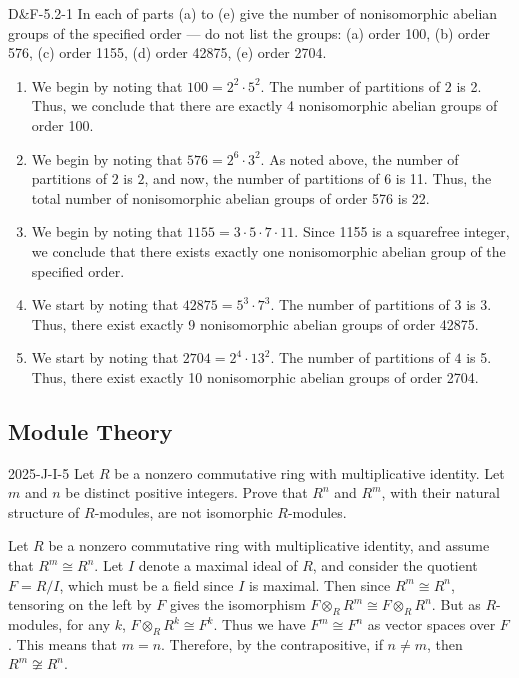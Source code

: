 \documentclass{article}
\begin{document}
	\begin{prb}{D\&F-5.2-1}
		In each of parts (a) to (e) give the number of nonisomorphic abelian groups of the specified order --- do not list the groups: (a) order 100, (b) order 576, (c) order 1155, (d) order 42875, (e) order 2704. 
	\end{prb}
	\begin{enumerate}[itemsep =-2pt,label = (\alph{*})]
		\item We begin by noting that $100 = 2^{2} \cdot 5^{2}$. The number of partitions of $2$ is 2. Thus, we conclude that there are exactly 4 nonisomorphic abelian groups of order 100. 
		\item We begin by noting that $576 = 2^{6} \cdot 3^{2}$. As noted above, the number of partitions of $2$ is $2$, and now, the number of partitions of $6$ is 11. Thus, the total number of nonisomorphic abelian groups of order 576 is 22. 
		\item We begin by noting that $1155 = 3 \cdot 5 \cdot 7 \cdot 11$. Since 1155 is a squarefree integer, we conclude that there exists exactly one nonisomorphic abelian group of the specified order. 
		\item We start by noting that $42875 = 5^{3} \cdot 7^{3}$. The number of partitions of $3$ is $3$. Thus, there exist exactly 9 nonisomorphic abelian groups of order 42875. 
		\item We start by noting that $2704 = 2^{4} \cdot 13^{2}$. The number of partitions of $4$ is 5. Thus, there exist exactly 10 nonisomorphic abelian groups of order 2704. 
	\end{enumerate}
	
	
	
	
	\newpage 
	\subsection{Module Theory}
	\label{subsec:modules}	
	\begin{prb}{2025-J-I-5}
		Let $R$ be a nonzero commutative ring with multiplicative identity. Let $m$ and $n$ be distinct positive integers. Prove that $R^{n}$ and $R^{m}$, with their natural structure of $R$-modules, are not isomorphic $R$-modules. 
	\end{prb}
	Let $R$ be a nonzero commutative ring with multiplicative identity, and assume that $R^{m} \cong R^{n}$. Let $I$ denote a maximal ideal of $R$, and consider the quotient $F = R/I$, which must be a field since $I$ is maximal. Then since $R^{m} \cong R^{n}$, tensoring on the left by $F$ gives the isomorphism $F \otimes_{R} R^{m} \cong F \otimes_{R} R^{n}$. But as $R$-modules, for any $k$, $F \otimes_{R} R^{k} \cong F^{k}$. Thus we have $F^{m} \cong F^{n}$ as vector spaces over $F$. This means that $m = n$. Therefore, by the contrapositive, if $n \neq m$, then $R^{m} \not\cong R^{n}$. 
	
\end{document}
